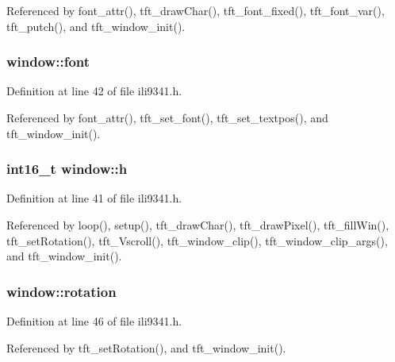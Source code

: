 Referenced by font\+\_\+attr(), tft\+\_\+draw\+Char(), tft\+\_\+font\+\_\+fixed(), tft\+\_\+font\+\_\+var(), tft\+\_\+putch(), and tft\+\_\+window\+\_\+init().

\subsubsection[{\texorpdfstring{font}{font}}]{ window\+::font}\hypertarget{structwindow_acee24e56db43557a46cbb5ca3fe35021}{}\label{structwindow_acee24e56db43557a46cbb5ca3fe35021}


Definition at line 42 of file ili9341.\+h.



Referenced by font\+\_\+attr(), tft\+\_\+set\+\_\+font(), tft\+\_\+set\+\_\+textpos(), and tft\+\_\+window\+\_\+init().

\subsubsection[{\texorpdfstring{h}{h}}]{\setlength{\rightskip}{0pt plus 5cm}int16\+\_\+t window\+::h}\hypertarget{structwindow_a822391abd5d09e6ce7152f68cff3ef2b}{}\label{structwindow_a822391abd5d09e6ce7152f68cff3ef2b}


Definition at line 41 of file ili9341.\+h.



Referenced by loop(), setup(), tft\+\_\+draw\+Char(), tft\+\_\+draw\+Pixel(), tft\+\_\+fill\+Win(), tft\+\_\+set\+Rotation(), tft\+\_\+\+Vscroll(), tft\+\_\+window\+\_\+clip(), tft\+\_\+window\+\_\+clip\+\_\+args(), and tft\+\_\+window\+\_\+init().

\subsubsection[{\texorpdfstring{rotation}{rotation}}]{ window\+::rotation}\hypertarget{structwindow_afbd48ebcb41e68d0f458dac593578aa8}{}\label{structwindow_afbd48ebcb41e68d0f458dac593578aa8}


Definition at line 46 of file ili9341.\+h.



Referenced by tft\+\_\+set\+Rotation(), and tft\+\_\+window\+\_\+init().

